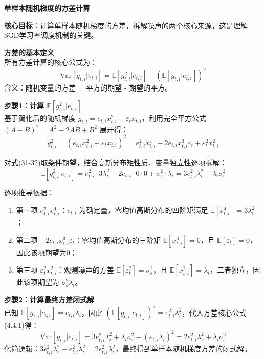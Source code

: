\documentclass[10pt]{article}
\numberwithin{equation}{section}
\theoremstyle{plain}
\theoremstyle{definition}
\theoremstyle{remark}
\begin{document}
{\par\vspace{0.8ex}\noindent\normalsize\bfseries\color{secblue} 单样本随机梯度的方差计算\par}
\textbf{核心目标}：计算单样本随机梯度的方差，拆解噪声的两个核心来源，这是理解SGD学习率调度机制的关键。

\textbf{方差的基本定义}\\
所有方差计算的核心公式为：
\[ \displaystyle \text{Var}[g_{t,i}|e_{t,i}] = \mathbb{E}[g_{t,i}^2|e_{t,i}] - \left(\mathbb{E}[g_{t,i}|e_{t,i}]\right)^2 \tag{4.4.1} \]
含义：随机变量的方差 = 平方的期望 - 期望的平方。

\textbf{步骤1：计算 $\mathbb{E}[g_{t,i}^2|e_{t,i}]$}\\
基于简化后的随机梯度 $g_{t,i} = e_{t,i}x_{t,i}^2 - \varepsilon_t x_{t,i}$，利用完全平方公式 $(A-B)^2 = A^2 - 2AB + B^2$ 展开得：
\[ \displaystyle g_{t,i}^2 = (e_{t,i}x_{t,i}^2 - \varepsilon_t x_{t,i})^2 = e_{t,i}^2 x_{t,i}^4 - 2e_{t,i} x_{t,i}^3 \varepsilon_t + \varepsilon_t^2 x_{t,i}^2 \tag{31-32} \]

对式(31-32)取条件期望，结合高斯分布矩性质、变量独立性逐项拆解：
\[ \displaystyle \mathbb{E}[g_{t,i}^2|e_{t,i}] = e_{t,i}^2 \cdot 3\lambda_i^2 - 2e_{t,i} \cdot 0 \cdot 0 + \sigma_\varepsilon^2 \cdot \lambda_i = 3e_{t,i}^2\lambda_i^2 + \lambda_i\sigma_\varepsilon^2 \tag{33} \]

逐项推导依据：
\begin{enumerate}[label=\arabic*., leftmargin=*]
    \item 第一项 $e_{t,i}^2 x_{t,i}^4$：$e_{t,i}$ 为确定量，零均值高斯分布的四阶矩满足 $\mathbb{E}[x_{t,i}^4] = 3\lambda_i^2$；
    \item 第二项 $-2e_{t,i} x_{t,i}^3 \varepsilon_t$：零均值高斯分布的三阶矩 $\mathbb{E}[x_{t,i}^3] = 0$，且 $\mathbb{E}[\varepsilon_t] = 0$，因此该项期望为0；
    \item 第三项 $\varepsilon_t^2 x_{t,i}^2$：观测噪声的方差 $\mathbb{E}[\varepsilon_t^2] = \sigma_\varepsilon^2$，且 $\mathbb{E}[x_{t,i}^2] = \lambda_i$，二者独立，因此该项期望为 $\sigma_\varepsilon^2 \lambda_i$。
\end{enumerate}

\textbf{步骤2：计算最终方差闭式解}\\
已知 $\mathbb{E}[g_{t,i}|e_{t,i}] = e_{t,i}\lambda_i$，因此 $\left(\mathbb{E}[g_{t,i}|e_{t,i}]\right)^2 = e_{t,i}^2\lambda_i^2$，代入方差核心公式(4.4.1)得：
\[ \displaystyle \text{Var}[g_{t,i}|e_{t,i}] = 3e_{t,i}^2\lambda_i^2 + \lambda_i\sigma_\varepsilon^2 - (e_{t,i}\lambda_i)^2 = 2e_{t,i}^2\lambda_i^2 + \lambda_i\sigma_\varepsilon^2 \tag{34} \]
化简逻辑：$3e_{t,i}^2\lambda_i^2 - e_{t,i}^2\lambda_i^2 = 2e_{t,i}^2\lambda_i^2$，最终得到单样本随机梯度方差的闭式解。
\end{document}
